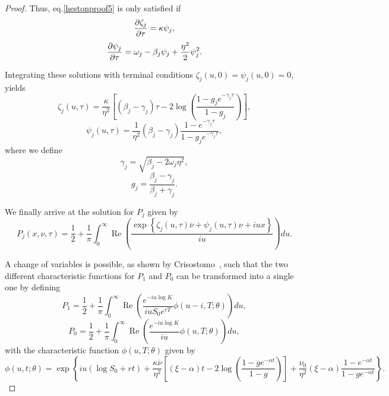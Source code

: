 \begin{proof}
Thus, eq.\eqref{hestonproof5} is only satisfied if
\begin{equation}
\pdv{\zeta_j}{\tau}=\kappa\psi_j,
\end{equation}
\begin{equation}
\pdv{\psi_j}{\tau}=\omega_j-\beta_j\psi_j+\frac{\eta^2}{2}\psi_j^2.
\end{equation}

Integrating these solutions with terminal conditions $\zeta_j(u,0)=\psi_j(u,0)=0$, yields
\begin{equation}
\zeta_j(u,\tau)=\frac{\kappa}{\eta^2}\left[\left(\beta_j-\gamma_j\right)\tau-2\log\left(\frac{1-g_je^{-\gamma_j \tau}}{1-g_j}\right)\right],
\end{equation}
\begin{equation}
\psi_j(u,\tau)=\frac{1}{\eta^2}\left(\beta_j-\gamma_j\right)\frac{1-e^{-\gamma_j \tau}}{1-g_je^{-\gamma_j \tau}},
\end{equation}
\noindent where we define
\begin{equation}
\gamma_j=\sqrt{\beta_j-2\omega_j\eta^2},
\end{equation}
\begin{equation}
g_j=\frac{\beta_j-\gamma_j}{\beta_j+\gamma_j}.
\end{equation}

We finally arrive at the solution for $P_j$ given by
\begin{equation}
P_j(x,\nu,\tau)=\frac{1}{2}+\frac{1}{\pi}\int_0^\infty\operatorname{Re}\left(\frac{\exp\left\{\zeta_j(u,\tau)\overline{\nu}+\psi_j(u,\tau)\nu+iux\right\}}{iu}\right)du.
\end{equation}

A change of variables is possible, as shown by Crisostomo~\citep{Crisostomo}, such that the two different characteristic functions for $P_1$ and $P_0$ can be transformed into a single one by defining
\begin{equation}
P_1=\frac{1}{2}+\frac{1}{\pi}\int_0^\infty\operatorname{Re}\left(\frac{e^{-iu\log K}}{iuS_0e^{rT}}\phi(u-i,T;\theta)\right)du,
\end{equation}
\begin{equation}
P_0=\frac{1}{2}+\frac{1}{\pi}\int_0^\infty\operatorname{Re}\left(\frac{e^{-iu\log K}}{iu}\phi(u,T;\theta)\right)du,
\end{equation}
\noindent with the characteristic function $\phi(u,T;\theta)$ given by
\begin{equation}
\phi(u,t;\theta)=\exp\left\{iu\left(\log S_0+rt\right)+\frac{\kappa\overline{\nu}}{\eta^2}\left[\left(\xi-\alpha\right)t-2\log\left(\frac{1-ge^{-\alpha t}}{1-g}\right)\right]+\frac{\nu_0}{\eta^2}\left(\xi-\alpha\right)\frac{1-e^{-\alpha t}}{1-ge^{-\alpha t}}\right\}.
\end{equation}

\end{proof}



